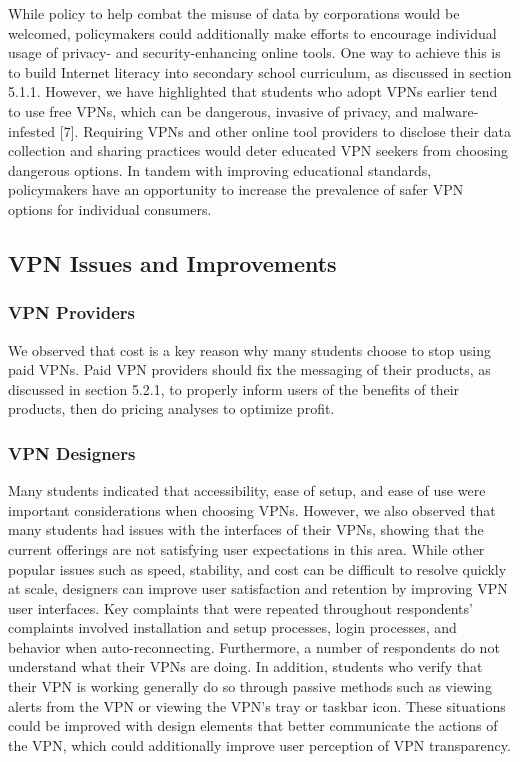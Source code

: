 While policy to help combat the misuse of data by corporations would be
welcomed, policymakers could additionally make efforts to encourage individual
usage of privacy- and security-enhancing online tools. One way to achieve this
is to build Internet literacy into secondary school curriculum, as discussed
in section 5.1.1. However, we have highlighted that students who adopt VPNs
earlier tend to use free VPNs, which can be dangerous, invasive of privacy,
and malware-infested [7]. Requiring VPNs and other online tool providers to
disclose their data collection and sharing practices would deter educated VPN
seekers from choosing dangerous options. In tandem with improving educational
standards, policymakers have an opportunity to increase the prevalence of
safer VPN options for individual consumers.

\subsection{VPN Issues and Improvements} \subsubsection{VPN Providers}

We observed that cost is a key reason why many students choose to stop using
paid VPNs. Paid VPN providers should fix the messaging of their products, as
discussed in section 5.2.1, to properly inform users of the benefits of their
products, then do pricing analyses to optimize profit.

\subsubsection{VPN Designers}

Many students indicated that accessibility, ease of setup, and ease of use
were important considerations when choosing VPNs. However, we also observed
that many students had issues with the interfaces of their VPNs, showing that
the current offerings are not satisfying user expectations in this area. While
other popular issues such as speed, stability, and cost can be difficult to
resolve quickly at scale, designers can improve user satisfaction and
retention by improving VPN user interfaces. Key complaints that were repeated
throughout respondents’ complaints involved installation and setup processes,
login processes, and behavior when auto-reconnecting. Furthermore, a number of
respondents do not understand what their VPNs are doing. In addition, students
who verify that their VPN is working generally do so through passive methods
such as viewing alerts from the VPN or viewing the VPN’s tray or taskbar icon.
These situations could be improved with design elements that better
communicate the actions of the VPN, which could additionally improve user
perception of VPN transparency.

